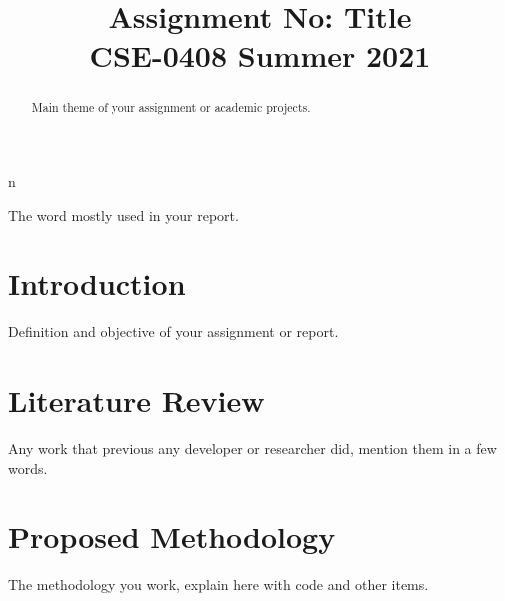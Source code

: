 \documentclass[conference]{IEEEtran}
\begin{document}
\title{Assignment No: Title\\
{\footnotesize \textsuperscript{}CSE-0408 Summer 2021 }
}

\author{
}

\maketitle

\begin{abstract}

Main theme of your assignment or academic projects.


\end{abstract}n


\begin{IEEEkeywords}
The word mostly used in your report.
\end{IEEEkeywords}

\section{Introduction}
Definition and objective of your assignment or report.

\section{Literature Review}

Any work that previous any developer or researcher did, mention them in a few words.

\section{Proposed Methodology}

The methodology you work, explain here with code and other items.
\end{document}
